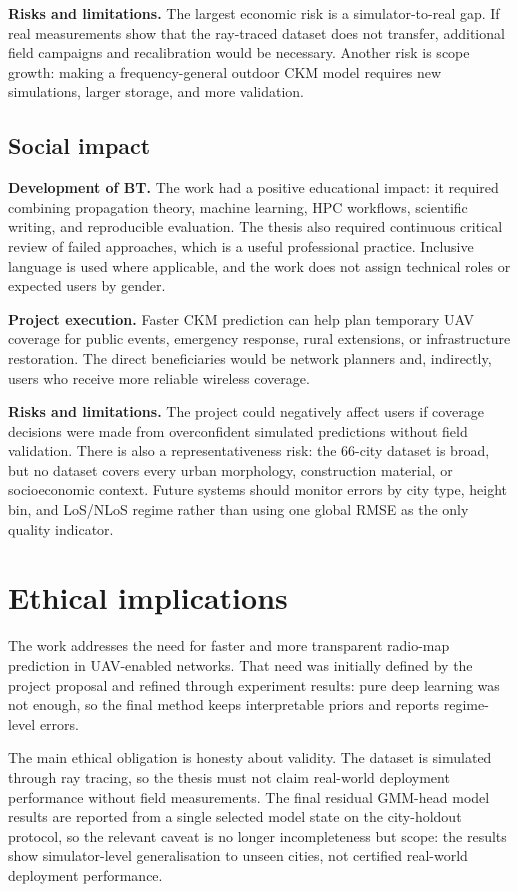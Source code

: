 \textbf{Risks and limitations.} The largest economic risk is a simulator-to-real
gap. If real measurements show that the ray-traced dataset does not transfer,
additional field campaigns and recalibration would be necessary. Another risk
is scope growth: making a frequency-general outdoor CKM model requires new
simulations, larger storage, and more validation.

\subsection{Social impact}

\textbf{Development of BT.} The work had a positive educational impact: it
required combining propagation theory, machine learning, HPC workflows,
scientific writing, and reproducible evaluation. The thesis also required
continuous critical review of failed approaches, which is a useful professional
practice. Inclusive language is used where applicable, and the work does not
assign technical roles or expected users by gender.

\textbf{Project execution.} Faster CKM prediction can help plan temporary UAV
coverage for public events, emergency response, rural extensions, or
infrastructure restoration. The direct beneficiaries would be network planners
and, indirectly, users who receive more reliable wireless coverage.

\textbf{Risks and limitations.} The project could negatively affect users if
coverage decisions were made from overconfident simulated predictions without
field validation. There is also a representativeness risk: the 66-city dataset
is broad, but no dataset covers every urban morphology, construction material,
or socioeconomic context. Future systems should monitor errors by city type,
height bin, and LoS/NLoS regime rather than using one global RMSE as the only
quality indicator.

\section{Ethical implications}

The work addresses the need for faster and more transparent radio-map
prediction in UAV-enabled networks. That need was initially defined by the
project proposal and refined through experiment results: pure deep learning was
not enough, so the final method keeps interpretable priors and reports
regime-level errors.

The main ethical obligation is honesty about validity. The dataset is simulated
through ray tracing, so the thesis must not claim real-world deployment
performance without field measurements. The final residual GMM-head model results are reported
from a single selected model state on the city-holdout protocol, so the relevant
caveat is no longer incompleteness but scope: the results show simulator-level
generalisation to unseen cities, not certified real-world deployment
performance.

